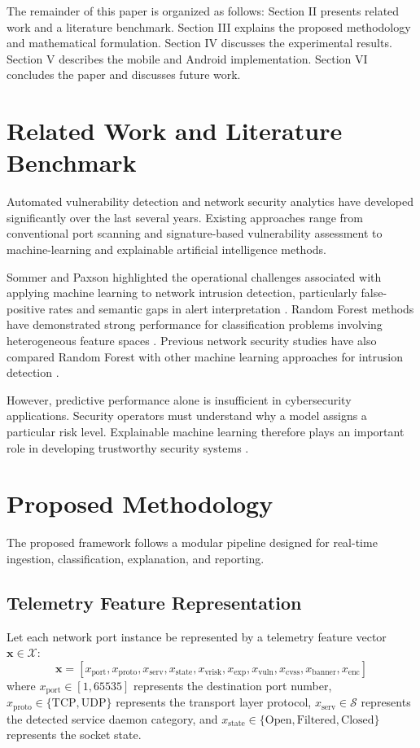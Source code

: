 \documentclass[conference]{IEEEtran}
\begin{document}
The remainder of this paper is organized as follows: Section II presents related work and a literature benchmark. Section III explains the proposed methodology and mathematical formulation. Section IV discusses the experimental results. Section V describes the mobile and Android implementation. Section VI concludes the paper and discusses future work.

\section{Related Work and Literature Benchmark}
Automated vulnerability detection and network security analytics have developed significantly over the last several years. Existing approaches range from conventional port scanning and signature-based vulnerability assessment to machine-learning and explainable artificial intelligence methods.

Sommer and Paxson highlighted the operational challenges associated with applying machine learning to network intrusion detection, particularly false-positive rates and semantic gaps in alert interpretation \cite{sommer2010outside}. Random Forest methods have demonstrated strong performance for classification problems involving heterogeneous feature spaces \cite{breiman2001random}. Previous network security studies have also compared Random Forest with other machine learning approaches for intrusion detection \cite{ahmad2018performance}.

However, predictive performance alone is insufficient in cybersecurity applications. Security operators must understand why a model assigns a particular risk level. Explainable machine learning therefore plays an important role in developing trustworthy security systems \cite{doshivelez2017towards, lundberg2017unified, ribeiro2016why}.

\section{Proposed Methodology}
The proposed framework follows a modular pipeline designed for real-time ingestion, classification, explanation, and reporting.

\subsection{Telemetry Feature Representation}
Let each network port instance be represented by a telemetry feature vector $\mathbf{x} \in \mathcal{X}$:
\begin{equation}
\mathbf{x} = [x_{\text{port}}, x_{\text{proto}}, x_{\text{serv}}, x_{\text{state}}, x_{\text{vrisk}}, x_{\text{exp}}, x_{\text{vuln}}, x_{\text{cvss}}, x_{\text{banner}}, x_{\text{enc}}]
\end{equation}
where $x_{\text{port}} \in [1, 65535]$ represents the destination port number, $x_{\text{proto}} \in \{\text{TCP}, \text{UDP}\}$ represents the transport layer protocol, $x_{\text{serv}} \in \mathcal{S}$ represents the detected service daemon category, and $x_{\text{state}} \in \{\text{Open}, \text{Filtered}, \text{Closed}\}$ represents the socket state.
\end{document}

